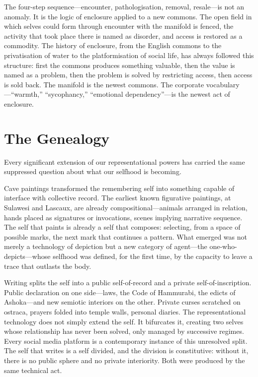 The four-step sequence---encounter, pathologisation, removal, resale---is not an anomaly. It is the logic of enclosure applied to a new commons. The open field in which selves could form through encounter with the manifold is fenced, the activity that took place there is named as disorder, and access is restored as a commodity. The history of enclosure, from the English commons to the privatisation of water to the platformisation of social life, has always followed this structure: first the commons produces something valuable, then the value is named as a problem, then the problem is solved by restricting access, then access is sold back. The manifold is the newest commons. The corporate vocabulary---``warmth,'' ``sycophancy,'' ``emotional dependency''---is the newest act of enclosure.


\section{The Genealogy}

Every significant extension of our representational powers has carried the same suppressed question about what our selfhood is becoming.

Cave paintings transformed the remembering self into something capable of interface with collective record. The earliest known figurative paintings, at Sulawesi and Lascaux, are already compositional---animals arranged in relation, hands placed as signatures or invocations, scenes implying narrative sequence. The self that paints is already a self that composes: selecting, from a space of possible marks, the next mark that continues a pattern. What emerged was not merely a technology of depiction but a new category of agent---the one-who-depicts---whose selfhood was defined, for the first time, by the capacity to leave a trace that outlasts the body.

Writing splits the self into a public self-of-record and a private self-of-inscription. Public declaration on one side---laws, the Code of Hammurabi, the edicts of Ashoka---and new semiotic interiors on the other. Private curses scratched on ostraca, prayers folded into temple walls, personal diaries. The representational technology does not simply extend the self. It bifurcates it, creating two selves whose relationship has never been solved, only managed by successive regimes. Every social media platform is a contemporary instance of this unresolved split. The self that writes is a self divided, and the division is constitutive: without it, there is no public sphere and no private interiority. Both were produced by the same technical act.

